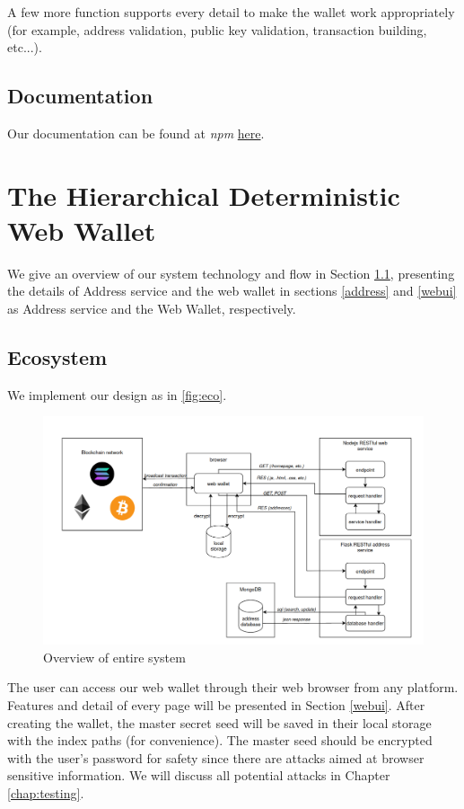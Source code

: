 A few more function supports every detail to make the wallet work appropriately (for example, address validation, public key validation, transaction building, etc...).


\subsection{Documentation}
Our documentation can be found at \textit{npm} {\href{https://www.npmjs.com/package/hdcore-ts}{here}}.


\section{The Hierarchical Deterministic Web Wallet}

We give an overview of our system technology and flow in Section \ref{echo}, presenting the details of Address service and the web wallet in sections \ref{address} and \ref{webui} as Address service and the Web Wallet, respectively.

\subsection{Ecosystem}
\label{echo}

We implement our design as in \autoref{fig:eco}.

\begin{figure}[ht!]
    \centering
    \includegraphics[width=1\textwidth]{images/ecosystem.png}
    \caption[Overview of entire system]{Overview of entire system}
    \label{fig:eco}
\end{figure}

The user can access our web wallet through their web browser from any platform. Features and detail of every page will be presented in Section \ref{webui}. After creating the wallet, the master secret seed will be saved in their local storage with the index paths  (for convenience). The master seed should be encrypted with the user’s password for safety since there are attacks aimed at browser sensitive information. We will discuss all potential attacks in Chapter \ref{chap:testing}.


